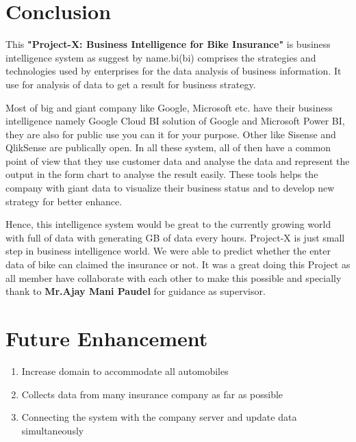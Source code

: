 \section{Conclusion}
\par
This \textbf{"Project-X: Business Intelligence for Bike Insurance"} is business intelligence system as suggest by name.\acl{bi}(\acs{bi}) comprises the strategies and technologies used by enterprises for the data analysis of business information. It use for analysis of data to get a result for business strategy.
\par Most of big and giant company like Google, Microsoft etc. have their business intelligence namely Google Cloud BI solution of Google and Microsoft Power BI, they are also for public use you can it for your purpose. Other like Sisense and QlikSense are publically open. In all these system, all of then have a common point of view that they use customer data and analyse the data and represent the output in the form chart to analyse the result easily. These tools helps the company with giant data to visualize their business status and to develop new strategy for better enhance.
\par 
Hence, this intelligence system would be great to the currently growing world with full of data with generating GB of data every hours. Project-X is just small step in  business intelligence world. We were able to predict whether the enter data of bike can claimed the insurance or not. It was a great doing this Project as all member have collaborate with each other to make this possible and specially thank to \textbf{Mr.Ajay Mani Paudel} for guidance as supervisor.


\section{Future Enhancement}
\begin{enumerate}
\item Increase domain to accommodate  all automobiles 
\item Collects data from many insurance company as far as possible
\item Connecting the system with the company server and update data simultaneously
\end{enumerate}

\renewcommand\bibname{References} %




